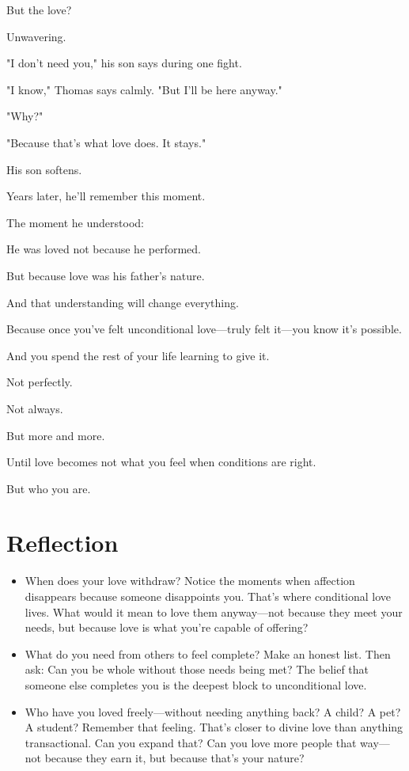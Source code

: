 \documentclass[11pt,twoside]{book}
\begin{document}
But the love?

Unwavering.

"I don't need you," his son says during one fight.

"I know," Thomas says calmly. "But I'll be here anyway."

"Why?"

"Because that's what love does. It stays."

His son softens.

Years later, he'll remember this moment.

The moment he understood:

He was loved not because he performed.

But because love was his father's nature.

And that understanding will change everything.

Because once you've felt unconditional love—truly felt it—you know it's possible.

And you spend the rest of your life learning to give it.

Not perfectly.

Not always.

But more and more.

Until love becomes not what you feel when conditions are right.

But who you are.

\section*{Reflection}

\begin{itemize}
\item When does your love withdraw? Notice the moments when affection disappears because someone disappoints you. That's where conditional love lives. What would it mean to love them anyway—not because they meet your needs, but because love is what you're capable of offering?
\item What do you need from others to feel complete? Make an honest list. Then ask: Can you be whole without those needs being met? The belief that someone else completes you is the deepest block to unconditional love.
\item Who have you loved freely—without needing anything back? A child? A pet? A student? Remember that feeling. That's closer to divine love than anything transactional. Can you expand that? Can you love more people that way—not because they earn it, but because that's your nature?
\end{itemize}
\end{document}
